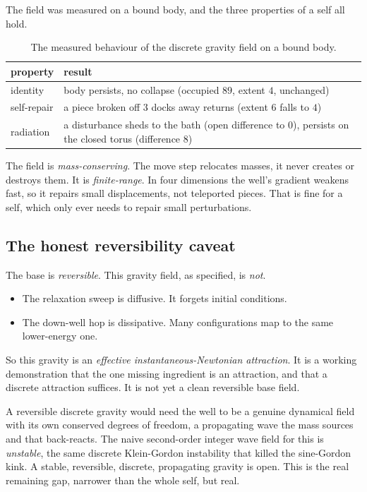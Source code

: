 The field was measured on a bound body, and the three properties of a self all hold.

\begin{table}[ht]
\centering
\begin{tabular}{@{}ll@{}}
\toprule
property & result \\
\midrule
identity & body persists, no collapse (occupied $89$, extent $4$, unchanged) \\
self-repair & a piece broken off $3$ docks away returns (extent $6$ falls to $4$) \\
radiation & a disturbance sheds to the bath (open difference to $0$), persists on the closed torus (difference $8$) \\
\bottomrule
\end{tabular}
\caption{The measured behaviour of the discrete gravity field on a bound body.}
\label{tab:gravity-measured}
\end{table}

The field is \emph{mass-conserving}. The move step relocates masses, it never creates or destroys them. It is \emph{finite-range}. In four dimensions the well's gradient weakens fast, so it repairs small displacements, not teleported pieces. That is fine for a self, which only ever needs to repair small perturbations.

\subsection{The honest reversibility caveat}

The base is \emph{reversible}. This gravity field, as specified, is \emph{not}.

\begin{itemize}
\item The relaxation sweep is diffusive. It forgets initial conditions.
\item The down-well hop is dissipative. Many configurations map to the same lower-energy one.
\end{itemize}

So this gravity is an \emph{effective instantaneous-Newtonian attraction}. It is a working demonstration that the one missing ingredient is an attraction, and that a discrete attraction suffices. It is not yet a clean reversible base field.

\begin{result}
A reversible discrete gravity would need the well to be a genuine dynamical field with its own conserved degrees of freedom, a propagating wave the mass sources and that back-reacts. The naive second-order integer wave field for this is \emph{unstable}, the same discrete Klein-Gordon instability that killed the sine-Gordon kink. A stable, reversible, discrete, propagating gravity is open. This is the real remaining gap, narrower than the whole self, but real.
\end{result}


